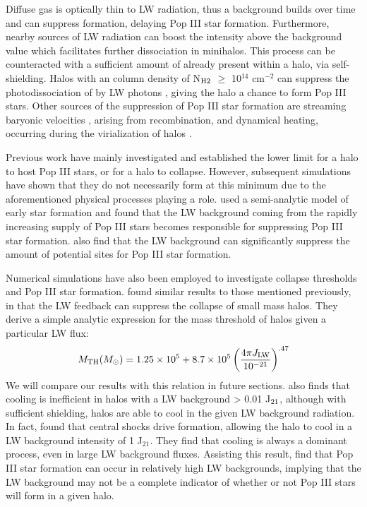 \documentclass[a4paper,fleqn,usenatbib]{mnras}
\begin{document}
Diffuse gas is optically thin to LW radiation, thus a background builds over time and can suppress \hh{} formation, delaying Pop III star formation. Furthermore, nearby sources of LW radiation can boost the intensity above the background value which facilitates further \hh{} dissociation in minihalos. This process can be counteracted with a sufficient amount of \hh{} already present within a halo, via \hh{} self-shielding. Halos with an \hh{} column density of N$_{\rm H2}$ $\geq$ 10$^{14}$ cm$^{-2}$ can suppress the photodissociation of \hh{} by LW photons \citep{Draine96}, giving the halo a chance to form Pop III stars. Other sources of the suppression of Pop III star formation are streaming baryonic velocities \citep{Tselia11, Greif11_Delay, Naoz12,OLeary12}, arising from recombination, and dynamical heating, occurring during the virialization of halos \citep{Yoshida03, Fernandez14}. 

Previous work have mainly investigated and established the lower limit for a halo to host Pop III stars, or for a halo to collapse. However, subsequent simulations have shown that they do not necessarily form at this minimum due to the aforementioned physical processes playing a role. \citet{Mebane18} used a semi-analytic model of early star formation and found that the LW background coming from the rapidly increasing supply of Pop III stars becomes responsible for suppressing Pop III star formation. \citet{Griffen18} also find that the LW background can significantly suppress the amount of potential sites for Pop III star formation. 

Numerical simulations have also been employed to investigate collapse thresholds and Pop III star formation. \citet[hereafter M01]{Machacek01} found similar results to those mentioned previously, in that the LW feedback can suppress the collapse of small mass halos. They derive a simple analytic expression for the mass threshold of halos given a particular LW flux:
\begin{equation} \label{mthresh}
	M_{\rm TH} ( M_{\odot} ) = 1.25 \times 10^{5} + 8.7  \times 10^{5} \left( \frac{4 \pi J_{\rm LW}}{10^{-21}} \right)^{.47}
\end{equation}
We will compare our results with this relation in future sections. \citet{Yoshida03} also finds that cooling is inefficient in halos with a LW background > 0.01 J$_{\rm 21}$, although with sufficient \hh{} shielding, halos are able to cool in the given LW background radiation. In fact, \citet{Wise07_UVB} found that central shocks drive \hh{} formation, allowing the halo to cool in a LW background intensity of 1 J$_{21}$. They find that \hh{} cooling is always a dominant process, even in large LW background fluxes. Assisting this result, \citet{OShea08} find that Pop III star formation can occur in relatively high LW backgrounds, implying that the LW background may not be a complete indicator of whether or not Pop III stars will form in a given halo.    
\end{document}
